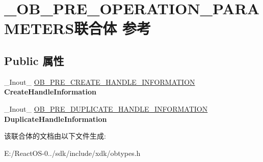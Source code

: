 \hypertarget{union___o_b___p_r_e___o_p_e_r_a_t_i_o_n___p_a_r_a_m_e_t_e_r_s}{}\section{\+\_\+\+O\+B\+\_\+\+P\+R\+E\+\_\+\+O\+P\+E\+R\+A\+T\+I\+O\+N\+\_\+\+P\+A\+R\+A\+M\+E\+T\+E\+R\+S联合体 参考}
\label{union___o_b___p_r_e___o_p_e_r_a_t_i_o_n___p_a_r_a_m_e_t_e_r_s}
\subsection*{Public 属性}
\begin{DoxyCompactItemize}
\item 
\mbox{\label{union___o_b___p_r_e___o_p_e_r_a_t_i_o_n___p_a_r_a_m_e_t_e_r_s_ae5d90b06c3f9909c5f33de9828c3a491}} 
\+\_\+\+Inout\+\_\+ \hyperlink{struct___o_b___p_r_e___c_r_e_a_t_e___h_a_n_d_l_e___i_n_f_o_r_m_a_t_i_o_n}{O\+B\+\_\+\+P\+R\+E\+\_\+\+C\+R\+E\+A\+T\+E\+\_\+\+H\+A\+N\+D\+L\+E\+\_\+\+I\+N\+F\+O\+R\+M\+A\+T\+I\+ON} {\bfseries Create\+Handle\+Information}
\item 
\mbox{\label{union___o_b___p_r_e___o_p_e_r_a_t_i_o_n___p_a_r_a_m_e_t_e_r_s_ad88d112700e141c571e4a9a1bca37230}} 
\+\_\+\+Inout\+\_\+ \hyperlink{struct___o_b___p_r_e___d_u_p_l_i_c_a_t_e___h_a_n_d_l_e___i_n_f_o_r_m_a_t_i_o_n}{O\+B\+\_\+\+P\+R\+E\+\_\+\+D\+U\+P\+L\+I\+C\+A\+T\+E\+\_\+\+H\+A\+N\+D\+L\+E\+\_\+\+I\+N\+F\+O\+R\+M\+A\+T\+I\+ON} {\bfseries Duplicate\+Handle\+Information}
\end{DoxyCompactItemize}


该联合体的文档由以下文件生成\+:\begin{DoxyCompactItemize}
\item 
E\+:/\+React\+O\+S-\/0../sdk/include/xdk/obtypes.\+h\end{DoxyCompactItemize}
